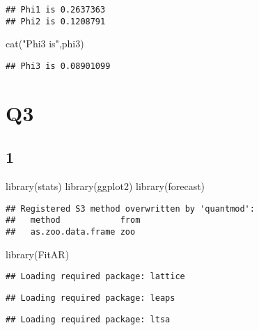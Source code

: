 \documentclass[
]{article}
\newenvironment{Shaded}{\begin{snugshade}}{\end{snugshade}}
\newcommand{\FunctionTok}[1]{\textcolor[rgb]{0.00,0.00,0.00}{#1}}
\newcommand{\NormalTok}[1]{#1}
\newcommand{\StringTok}[1]{\textcolor[rgb]{0.31,0.60,0.02}{#1}}
\begin{document}
\begin{verbatim}
## Phi1 is 0.2637363 
## Phi2 is 0.1208791
\end{verbatim}

\begin{Shaded}
\begin{Highlighting}[]
\FunctionTok{cat}\NormalTok{(}\StringTok{"Phi3 is"}\NormalTok{,phi3)}
\end{Highlighting}
\end{Shaded}

\begin{verbatim}
## Phi3 is 0.08901099
\end{verbatim}

\hypertarget{q3}{%
\section{Q3}\label{q3}}

\hypertarget{section}{%
\subsection{1}\label{section}}

\begin{Shaded}
\begin{Highlighting}[]
\FunctionTok{library}\NormalTok{(stats)}
\FunctionTok{library}\NormalTok{(ggplot2)}
\FunctionTok{library}\NormalTok{(forecast)}
\end{Highlighting}
\end{Shaded}

\begin{verbatim}
## Registered S3 method overwritten by 'quantmod':
##   method            from
##   as.zoo.data.frame zoo
\end{verbatim}

\begin{Shaded}
\begin{Highlighting}[]
\FunctionTok{library}\NormalTok{(FitAR)}
\end{Highlighting}
\end{Shaded}

\begin{verbatim}
## Loading required package: lattice
\end{verbatim}

\begin{verbatim}
## Loading required package: leaps
\end{verbatim}

\begin{verbatim}
## Loading required package: ltsa
\end{verbatim}
\end{document}
